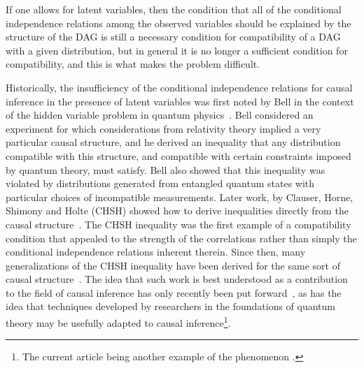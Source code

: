 \documentclass[aps,english,superscriptaddress,onecolumn,twoside,longbibliography,pra,floatfix,fleqn,nofootinbib]{revtex4-1}%
\theoremstyle{definition}
\newcounter{example}[section]
\begin{document}
If one allows for latent variables, then the condition that all of the conditional independence relations among the observed variables should be explained by the structure of the DAG is still a necessary condition for compatibility of a DAG with a given distribution, but in general it is no longer a sufficient condition for compatibility, and this is what makes the problem difficult. 


Historically, the insufficiency of the conditional independence relations for causal inference in the presence of latent variables was first
noted by Bell in the context of the hidden variable problem in quantum physics~\cite{bell1964einstein}. Bell considered an experiment for which considerations from relativity theory implied a very particular causal structure, and he derived an inequality
that any distribution compatible with this structure, and compatible with certain constraints imposed by quantum
theory, must satisfy. Bell also showed that this inequality was violated by distributions generated from entangled
quantum states with particular choices of incompatible measurements. Later work, by Clauser, Horne, Shimony and
Holte (CHSH) showed how to derive inequalities directly from the causal structure~\cite{CHSHOriginal}. The CHSH inequality was the
first example of a compatibility condition that appealed to the strength of the correlations rather than simply the
conditional independence relations inherent therein.
Since then, many generalizations of the CHSH inequality have been derived for the same sort of causal structure~\cite{Brunner2013Bell}. The idea that such work is best understood as a contribution to the field of causal inference has only recently been put forward~\cite{WoodSpekkens,fritz2012bell,pusey2014gdag,BeyondBellII}, as has the idea that techniques developed by researchers in the foundations of quantum theory may be usefully adapted to causal inference\footnote{The current article being another example of the phenomenon \cite{BeyondBellII,ChavesNoSignalling,chaves2014informationinference,weilenmann2016entropic,kela2016covariance,ChavesPolynomial,TavakoliStarNetworks,RossetNetworks,TavakoliNoncyclicNetworks}.}.
\end{document}
